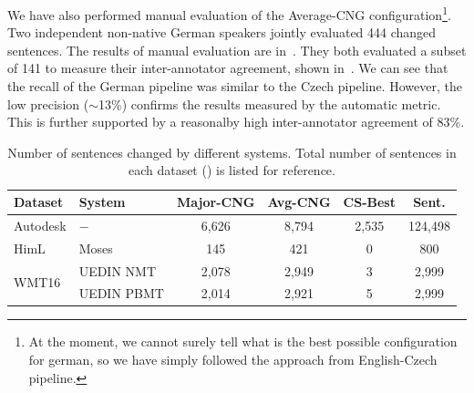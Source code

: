 \begin{table}[t]
\centering
\small
{}
\caption[Final German MLFix evaluation]{
    Final evaluation of the Englsh-German configuration of MLFix using BLUE metric.
	Values are multiplied by 100 for easier reading. Majority-CNG and Avg-CNG methods were compared
with the best English-Czech configuration.
}
\label{final_de-summary}
\end{table}

We have also performed manual evaluation of the Average-CNG configuration\footnote{At the moment, we cannot surely tell what is
the best possible configuration for german, so we have simply followed the approach from English-Czech pipeline.}. Two
independent non-native German speakers jointly evaluated 444 changed sentences. The results of manual evaluation are in~.
They both evaluated a subset of 141 to measure their inter-annotator agreement, shown in~.
We can see that the recall of the German pipeline was similar to the Czech pipeline. However, the low precision ($\sim$13\%)
confirms the results measured by the automatic metric. This is further supported by a reasonalby high inter-annotator agreement of 83\%.

\begin{table}[t]
\centering
\small

\begin{tabular}{|l|l||c|c|c||c|}
\hline
Dataset  &  System  &  Major-CNG  &  Avg-CNG  &  CS-Best  &  Sent.  \\
\hline
\hline
Autodesk  &  $-$  &  6,626  &  8,794  &  2,535  &  124,498  \\
\hline
HimL  &  Moses  &  145  &  421  &  0  &  800  \\
\hline
\multirow{2}{*}{WMT16}  &  UEDIN NMT  &  2,078  &  2,949  &  3  &  2,999  \\
&  UEDIN PBMT  &  2,014  &  2,921  &  5  &  2,999  \\
\hline
\end{tabular}

\caption[Final German MLFix evaluation - number of changed sentences]{
    Number of sentences changed by different systems. Total number of
sentences in each dataset () is listed for reference.
}   
\label{final_de-chgd}
\end{table}



